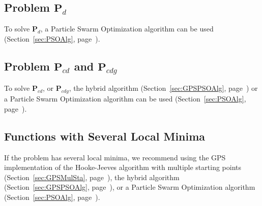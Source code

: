 \subsection{Problem $\mathbf P_{d}$}
To solve $\mathbf P_{d}$,
a Particle Swarm Optimization algorithm can be used
(Section~\ref{sec:PSOAlg}, page~\pageref{sec:PSOAlg}).

\subsection{Problem $\mathbf P_{cd}$ and $\mathbf P_{cdg}$}
To solve $\mathbf P_{cd}$, or $\mathbf P_{cdg}$,
the hybrid algorithm (Section~\ref{sec:GPSPSOAlg}, page~\pageref{sec:GPSPSOAlg})
or
a Particle Swarm Optimization algorithm can be used
(Section~\ref{sec:PSOAlg}, page~\pageref{sec:PSOAlg}).


\subsection{Functions with Several Local Minima}
If the problem has several local minima, we recommend using 
the GPS implementation of the Hooke-Jeeves algorithm
with multiple starting points (Section~\ref{sec:GPSMulSta}, page~\pageref{sec:GPSMulSta}),
the hybrid algorithm (Section~\ref{sec:GPSPSOAlg}, page~\pageref{sec:GPSPSOAlg}), or
a Particle Swarm Optimization algorithm
(Section~\ref{sec:PSOAlg}, page~\pageref{sec:PSOAlg}).

